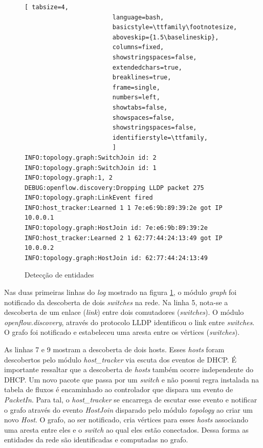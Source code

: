 \begin{figure}[h!]
    \centering
    \begin{lstlisting}[ tabsize=4,
                        language=bash,
                        basicstyle=\ttfamily\footnotesize,
                        aboveskip={1.5\baselineskip},
                        columns=fixed,
                        showstringspaces=false,
                        extendedchars=true,
                        breaklines=true,
                        frame=single,
                        numbers=left,
                        showtabs=false,
                        showspaces=false,
                        showstringspaces=false,
                        identifierstyle=\ttfamily,
                        ]
INFO:topology.graph:SwitchJoin id: 2
INFO:topology.graph:SwitchJoin id: 1
INFO:topology.graph:1, 2
DEBUG:openflow.discovery:Dropping LLDP packet 275
INFO:topology.graph:LinkEvent fired
INFO:host_tracker:Learned 1 1 7e:e6:9b:89:39:2e got IP 10.0.0.1
INFO:topology.graph:HostJoin id: 7e:e6:9b:89:39:2e
INFO:host_tracker:Learned 2 1 62:77:44:24:13:49 got IP 10.0.0.2
INFO:topology.graph:HostJoin id: 62:77:44:24:13:49
        \end{lstlisting}
    \caption{Detecção de entidades}
    \label{fig:detection}
\end{figure}

Nas duas primeiras linhas do \emph{log} mostrado na figura
\ref{fig:detection}, o módulo \emph{graph} foi notificado
da descoberta de dois \emph{switches} na rede.
Na linha 5, nota-se a descoberta de um enlace (\emph{link}) entre dois
comutadores (\emph{switches}).
O módulo \emph{openflow.discovery}, através do protocolo LLDP identificou
o link entre \emph{switches}.
O grafo foi notificado e estabeleceu uma aresta entre os
vértices (\emph{switches}).

As linhas 7 e 9 mostram a descoberta de dois hosts.
Esses \emph{hosts} foram descobertos pelo módulo \emph{host\_tracker} via
escuta dos eventos de DHCP.
É importante ressaltar que a descoberta de \emph{hosts} também ocorre
independente do DHCP.
Um novo pacote que passa por um \emph{switch} e não possui regra
instalada na tabela de fluxos é encaminhado ao controlador que
dispara um evento de \emph{PacketIn}.
Para tal, o \emph{host\_tracker} se encarrega de escutar esse evento
e notificar o grafo através do evento \emph{HostJoin} disparado pelo módulo
\emph{topology} ao criar um novo \emph{Host}.
O grafo, ao ser notificado, cria vértices para esses \emph{hosts} associando
uma aresta entre eles e o \emph{switch} ao qual eles estão conectados.
Dessa forma as entidades da rede são identificadas e computadas no grafo.


